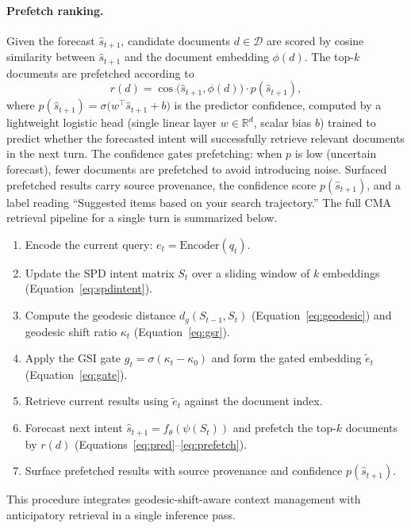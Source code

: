 \documentclass[preprint,12pt]{elsarticle}
\begin{document}
\paragraph{Prefetch ranking.} Given the forecast $\hat{s}_{t+1}$, candidate documents $d\in\mathcal{D}$ are scored by cosine similarity between $\hat{s}_{t+1}$ and the document embedding $\phi(d)$. The top-$k$ documents are prefetched according to
\begin{equation}
r(d) = \cos\bigl(\hat{s}_{t+1},\phi(d)\bigr) \cdot p(\hat{s}_{t+1}),
\label{eq:prefetch}
\end{equation}
where $p(\hat{s}_{t+1})=\sigma\bigl(w^\top \hat{s}_{t+1}+b\bigr)$ is the predictor confidence, computed by a lightweight logistic head (single linear layer $w\in\mathbb{R}^d$, scalar bias $b$) trained to predict whether the forecasted intent will successfully retrieve relevant documents in the next turn. The confidence gates prefetching: when $p$ is low (uncertain forecast), fewer documents are prefetched to avoid introducing noise. Surfaced prefetched results carry source provenance, the confidence score $p(\hat{s}_{t+1})$, and a label reading ``Suggested items based on your search trajectory.'' The full CMA retrieval pipeline for a single turn is summarized below.

\begin{enumerate}
  \item Encode the current query: $e_t = \text{Encoder}(q_t)$.
  \item Update the SPD intent matrix $S_t$ over a sliding window of $k$ embeddings (Equation~\ref{eq:spdintent}).
  \item Compute the geodesic distance $d_g(S_{t-1},S_t)$ (Equation~\ref{eq:geodesic}) and geodesic shift ratio $\kappa_t$ (Equation~\ref{eq:gsr}).
  \item Apply the GSI gate $g_t=\sigma(\kappa_t-\kappa_0)$ and form the gated embedding $\tilde{e}_t$ (Equation~\ref{eq:gate}).
  \item Retrieve current results using $\tilde{e}_t$ against the document index.
  \item Forecast next intent $\hat{s}_{t+1}=f_\theta(\psi(S_t))$ and prefetch the top-$k$ documents by $r(d)$ (Equations~\ref{eq:pred}--\ref{eq:prefetch}).
  \item Surface prefetched results with source provenance and confidence $p(\hat{s}_{t+1})$.
\end{enumerate}

This procedure integrates geodesic-shift-aware context management with anticipatory retrieval in a single inference pass.
\end{document}
